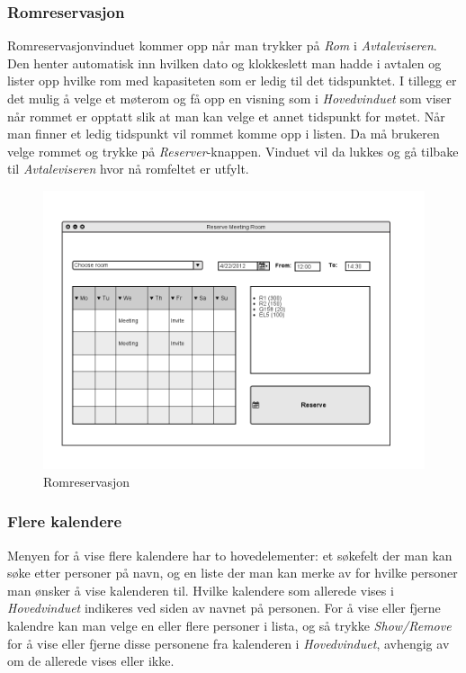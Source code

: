 \subsubsection{Romreservasjon}
Romreservasjonvinduet kommer opp når man trykker på \emph{Rom} i \emph{Avtaleviseren}. Den henter automatisk inn hvilken dato og klokkeslett man hadde i avtalen og lister opp hvilke rom med kapasiteten som er ledig til det tidspunktet. I tillegg er det mulig å velge et møterom og få opp en visning som i \emph{Hovedvinduet} som viser når rommet er opptatt slik at man kan velge et annet tidspunkt for møtet. Når man finner et ledig tidspunkt vil rommet komme opp i listen. Da må brukeren velge rommet og trykke på \emph{Reserver}-knappen. Vinduet vil da lukkes og gå tilbake til \emph{Avtaleviseren} hvor nå romfeltet er utfylt.

\begin{figure}[H]
\centering
\includegraphics[scale=0.65]{images/romreservasjon.png}
\caption{Romreservasjon}
\label{romreservasjon_image}
\end{figure}

\subsubsection{Flere kalendere}
Menyen for å vise flere kalendere har to hovedelementer: et søkefelt der man kan søke etter personer på navn, og en liste der man kan merke av for hvilke personer man ønsker å vise kalenderen til. Hvilke kalendere som allerede vises i \emph{Hovedvinduet} indikeres ved siden av navnet på personen. For å vise eller fjerne kalendre kan man velge en eller flere personer i lista, og så trykke \emph{Show/Remove} for å vise eller fjerne disse personene fra kalenderen i \emph{Hovedvinduet}, avhengig av om de allerede vises eller ikke. 

